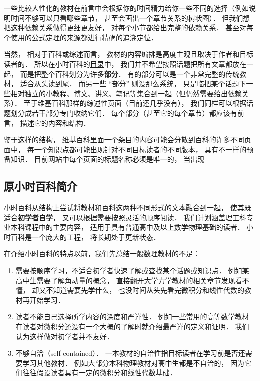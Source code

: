 一些比较人性化的教材在前言中会根据你的时间精力给你一些不同的选择（例如说明时间不够可以只看哪些章节， 甚至会画出一个章节关系的树状图）． 但我们想把这种依赖关系做得更细更友好， 对每个小节都给出完整的依赖关系． 甚至对每个使用的公式定理的来源都进行精确的追溯定位．

当然， 相对于百科或综述而言， 教材的内容编排是高度主观且取决于作者和目标读者的． 所以在小时百科的\href{http://wuli.wiki/online}{目录}中， 我们并不希望按照话题把所有文章都放在一起， 而是把整个百科划分为许多\textbf{部分}． 有的部分可以是一个非常完整的传统教材， 适合从头读到尾． 而另一些 “部分” 则没那么系统， 只是临把某个话题下一些相对独立的小教程、博文、讲义、笔记等集合到一起（但仍然需要给出依赖关系）． 至于维基百科那样的综述性页面（目前还几乎没有）， 我们同样可以根据话题划分成若干部分专门收纳它们． 每个部分（甚至它的每个章节）都应该有前言， 描述它的内容和结构．

鉴于这样的结构， 维基百科里面一个条目的内容可能会分散到百科的许多不同页面中， 每一个知识点都可能出现针对不同目标读者的不同版本， 具有不一样的预备知识． 目前网站中每个页面的标题名称必须是唯一的， 当出现


\subsection{原小时百科简介}

小时百科从结构上尝试将教材和百科这两种不同形式的文本融合到一起， 使其既适合\textbf{初学者自学}， 又可以根据需要按照灵活的顺序阅读． 我们计划涵盖理工科专业本科课程中的主要内容， 适用于具有普通高中及以上数学物理基础的读者． 小时百科是一个庞大的工程， 将长期处于更新状态．

在介绍小时百科的特点以前，我们先总结一般数理教材的不足：
\begin{enumerate}
\item 需要按顺序学习，不适合初学者快速了解或查找某个话题或知识点． 例如某高中生需要了解角动量的概念， 直接翻开大学力学教材的相关章节发现看不懂， 却又不知道需要先学什么， 也没时间从头先看完微积分和线性代数的教材再开始学习．
\item 读者不能自己选择所学内容的深度和严谨性． 例如一些常用的高等数学教材在读者对微积分还没有一个大概的了解时就介绍最严谨的定义和证明． 我们认为这样做对初学者并不友好．
\item 不够自洽（self-contained）． 一本教材的自洽性指目标读者在学习前是否还需要学习其他教材． 例如大部分本科物理教材对高中生都是不自洽的， 因为它们往往假设读者具有一定的微积分和线性代数基础．
\end{enumerate}


